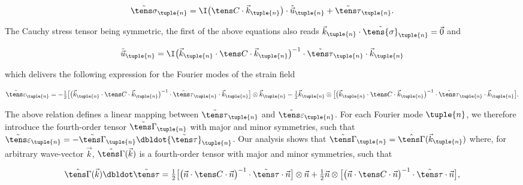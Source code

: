\documentclass[oneside]{memoir}
\begin{document}
\begin{equation*}
\begin{split}\tilde{\tens\sigma}_\tuple{n}
=\I\bigl(\tens C\cdot\vec k_\tuple{n}\bigr)\cdot\tilde{\vec u}_\tuple{n}
+\tilde{\tens\tau}_\tuple{n}.\end{split}\end{equation*}


The Cauchy stress tensor being symmetric, the first of the above equations also reads \(\vec k_\tuple{n}\cdot\tilde{\tens{\sigma}}_\tuple{n}=\vec 0\) and



\begin{equation*}
\begin{split}\tilde{\vec u}_\tuple{n}
=\I\bigl(\vec k_\tuple{n}\cdot\tens C\cdot\vec k_\tuple{n}\bigr)^{-1}
\cdot\tilde{\tens\tau}_\tuple{n}\cdot\vec k_\tuple{n}\end{split}\end{equation*}


which delivers the following expression for the Fourier modes of the strain field



\begin{equation*}
\begin{split}\tilde{\tens\varepsilon}_\tuple{n}
=-\tfrac12\bigl[\bigl(\vec k_\tuple{n}\cdot\tens C\cdot\vec k_\tuple{n}\bigr)^{-1}
\cdot\tilde{\tens\tau}_\tuple{n}\cdot\vec k_\tuple{n}\bigr]\otimes\vec k_\tuple{n}
-\tfrac12\vec k_\tuple{n}
\otimes\bigl[\bigl(\vec k_\tuple{n}\cdot\tens C\cdot\vec k_\tuple{n}\bigr)^{-1}
\cdot\tilde{\tens\tau}_\tuple{n}\cdot\vec k_\tuple{n}\bigr].\end{split}\end{equation*}


The above relation defines a linear mapping between \(\tilde{\tens\tau}_\tuple{n}\) and \(\tilde{\tens\varepsilon}_\tuple{n}\). For each Fourier mode \(\tuple{n}\), we therefore introduce the fourth-order tensor \(\tilde{\tens\Gamma}_\tuple{n}\) with major and minor symmetries, such that \(\tilde{\tens\varepsilon}_\tuple{n}=-\tilde{\tens\Gamma}_\tuple{n}\dbldot{\tilde{\tens\tau}}_\tuple{n}\). Our analysis shows that \(\tilde{\tens\Gamma}_\tuple{n}=\hat{\tens\Gamma}(\vec k_\tuple{n})\) where, for arbitrary wave-vector \(\vec k\), \(\hat{\tens\Gamma}(\vec k)\) is a fourth-order tensor with major and minor symmetries, such that



\begin{equation*}
\begin{split}\hat{\tens\Gamma}(\vec k)\dbldot\tilde{\tens\tau}
=\tfrac12\bigl[\bigl(\vec n\cdot\tens C\cdot\vec n\bigr)^{-1}
\cdot\tilde{\tens\tau}\cdot\vec n\bigr]\otimes\vec n
+\tfrac12\vec n\otimes\bigl[\bigl(\vec n\cdot\tens C\cdot\vec n\bigr)^{-1}
\cdot\tilde{\tens\tau}\cdot\vec n\bigr],\end{split}\end{equation*}
\end{document}

